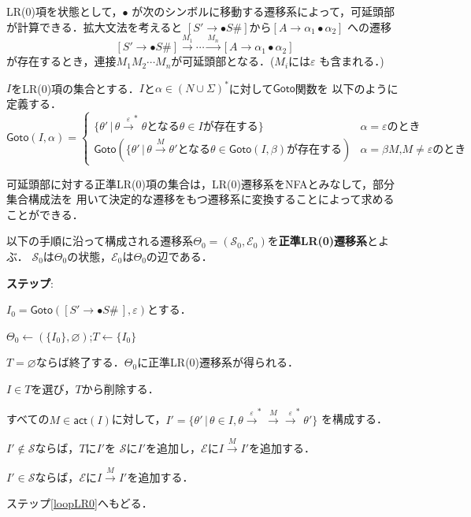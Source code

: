 \documentclass[dvipdfmx,a4j]{jbook}
\newcounter{coffee}
\begin{document}
LR(0)項を状態として，$\bullet$
が次のシンボルに移動する遷移系によって，可延頭部が計算できる．拡大文法を考えると
$[S'\rightarrow\bullet S\texttt{\#}]$から$[A\rightarrow\alpha_1\bullet\alpha_2]$
への遷移
\[[S'\rightarrow\bullet S\texttt{\#}]\xrightarrow{M_1}\cdots\xrightarrow{M_n}
[A\rightarrow\alpha_1\bullet\alpha_2]\]
が存在するとき，連接$M_1M_2\cdots M_n$が可延頭部となる．($M_i$には$\varepsilon$
も含まれる．)

\begin{Def}\label{GotoLR0}
  $I$をLR(0)項の集合とする．$I$と$\alpha\in(N\cup\Sigma)^\ast$に対して$\mathsf{Goto}$関数を
  以下のように定義する．
  \[
    \mathsf{Goto}(I,\alpha)=\begin{cases}
      \{\theta'\,|\,\theta\xrightarrow{\varepsilon}^\ast\theta\mbox{となる$\theta\in I$が存在する}\} 
      & \mbox{$\alpha=\varepsilon$のとき}\\
      \mathsf{Goto}(\{\theta'\,|\,\theta\xrightarrow{M}\theta'\mbox{となる$\theta\in
      \mathsf{Goto}(I,\beta)$が存在する})
      & \mbox{$\alpha=\beta M$,$M\not=\varepsilon$のとき}
    \end{cases}\]
\end{Def}

可延頭部に対する正準LR(0)項の集合は，LR(0)遷移系をNFAとみなして，部分集合構成法を
用いて決定的な遷移をもつ遷移系に変換することによって求めることができる．

\begin{Alg}\label{CanonicalLR0-TS}
  以下の手順に沿って構成される遷移系$\Theta_0=(\mathcal{S}_0,\mathcal{E}_0)$を{\bf 正準LR(0)遷移系}とよぶ．
  $\mathcal{S}_0$は$\Theta_0$の状態，$\mathcal{E}_0$は$\Theta_0$の辺である．
  \begin{list}{{\rm\bf ステップ}:}{}
    \item $I_0=\mathsf{Goto}([S'\rightarrow\bullet S\texttt{\#}\,],\varepsilon)$とする．
    \item $\Theta_0\leftarrow(\{I_0\},\varnothing)$;$T\leftarrow\{I_0\}$
    \item\label{loopLR0} $T=\varnothing$ならば終了する．$\Theta_0$に正準LR(0)遷移系が得られる．
    \item $I\in T$を選び，$T$から削除する．
    \item すべての$M\in\mathsf{act}(I)$に対して，$I'=\{\theta'\,|\,\theta\in I,\theta
    \xrightarrow{\varepsilon}^\ast\xrightarrow{M}\xrightarrow{\varepsilon}^\ast\theta'\}$
    を構成する．
    \begin{list}{}{}
      \item $I'\notin\mathcal{S}$ならば，$T$に$I'$を
        $\mathcal{S}$に$I'$を追加し，$\mathcal{E}$に$I\xrightarrow{M}I'$を追加する．
      \item $I'\in\mathcal{S}$ならば，$\mathcal{E}$に$I\xrightarrow{M}I'$を追加する．
    \end{list}
    \item ステップ\ref{loopLR0}へもどる．
  \end{list}  
\end{Alg}
\end{document}
